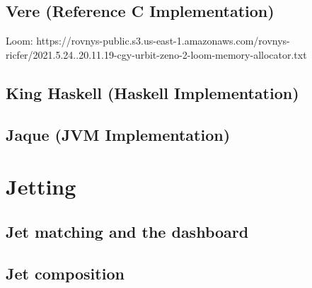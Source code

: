 \subsection{Vere (Reference C Implementation)}

Loom:  https://rovnys-public.s3.us-east-1.amazonaws.com/rovnys-ricfer/2021.5.24..20.11.19-cgy-urbit-zeno-2-loom-memory-allocator.txt

\subsection{King Haskell (Haskell Implementation)}

\subsection{Jaque (JVM Implementation)}

\section{Jetting}

\subsection{Jet matching and the dashboard}

\subsection{Jet composition}

